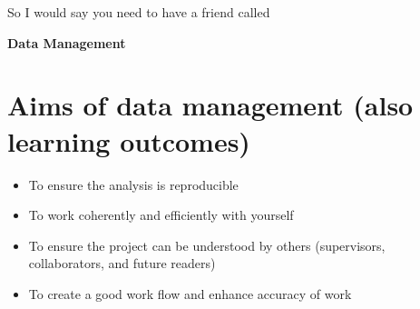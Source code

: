 \begin{frame}{\secname}

So I would say you need to have a friend called \\
\begin{center}
	{\huge \textbf{Data Management}}
\end{center}

\end{frame}

\section{Aims of data management (also learning outcomes)}
\begin{frame}{\secname}
\begin{itemize}[<+->]
	\item To ensure the analysis is reproducible
	\item To work coherently and efficiently with yourself 
	\item To ensure the project can be understood by others (supervisors, collaborators, and future readers)
	\item To create a good work flow and enhance accuracy of work 	
\end{itemize}
\end{frame}

